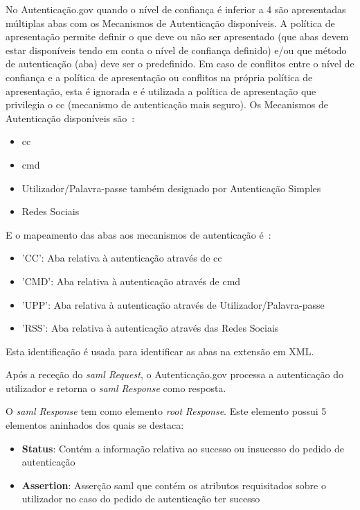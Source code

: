 \begin{itemize}
\begin{itemize}
        No Autenticação.gov quando o nível de confiança é inferior a 4 são apresentadas múltiplas abas com os Mecanismos de Autenticação disponíveis. A política de apresentação permite definir o que deve ou não ser apresentado (que abas devem estar disponíveis tendo em conta o nível de confiança definido) e/ou que método de autenticação (aba) deve ser o predefinido. Em caso de conflitos entre o nível de confiança e a política de apresentação ou conflitos na própria política de apresentação, esta é ignorada e é utilizada a política de apresentação que privilegia o \acrshort{cc} (mecanismo de autenticação mais seguro). Os Mecanismos de Autenticação disponíveis são~\cite{agov2}:
            \begin{itemize}
                \item \acrlong{cc}
                \item \acrlong{cmd}
                \item Utilizador/Palavra-passe também designado por Autenticação Simples
                \item Redes Sociais
            \end{itemize}
            E o mapeamento das abas aos mecanismos de autenticação é~\cite{agov2}:
            \begin{itemize}
                \item 'CC': Aba relativa à autenticação através de \acrlong{cc}
                \item 'CMD': Aba relativa à autenticação através de \acrlong{cmd}
                \item 'UPP': Aba relativa à autenticação através de Utilizador/Palavra-passe
                \item 'RSS': Aba relativa à autenticação através das Redes Sociais
            \end{itemize}
            Esta identificação é usada para identificar as abas na extensão em XML.
    \end{itemize}
\end{itemize}

Após a receção do \textit{\acrshort{saml} Request}, o Autenticação.gov processa a autenticação do utilizador e retorna o \textit{\acrshort{saml} Response} como resposta.

O \textit{\acrshort{saml} Response} tem como elemento \textit{root} \textit{Response}.
Este elemento possui 5 elementos aninhados dos quais se destaca:
\begin{itemize}
    \item \textbf{Status}: Contém a informação relativa ao sucesso ou insucesso do pedido de autenticação
    \item \textbf{Assertion}: Asserção \acrshort{saml} que contém os atributos requisitados sobre o utilizador no caso do pedido de autenticação ter sucesso
\end{itemize}

